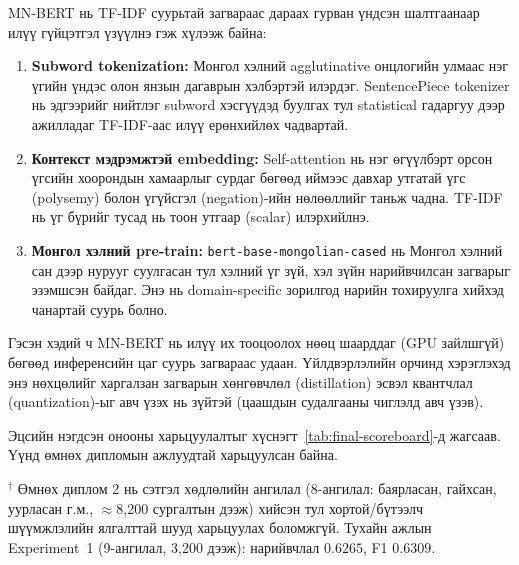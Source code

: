 MN-BERT нь TF-IDF суурьтай загвараас дараах гурван үндсэн шалтгаанаар илүү
гүйцэтгэл үзүүлнэ гэж хүлээж байна:

\begin{enumerate}
  \item \textbf{Subword tokenization:} Монгол хэлний agglutinative онцлогийн
    улмаас нэг үгийн үндэс олон янзын дагаврын хэлбэртэй илэрдэг. SentencePiece
    tokenizer нь эдгээрийг нийтлэг subword хэсгүүдэд буулгах тул statistical
    гадаргуу дээр ажилладаг TF-IDF-аас илүү ерөнхийлөх чадвартай.
  \item \textbf{Контекст мэдрэмжтэй embedding:} Self-attention нь нэг өгүүлбэрт
    орсон үгсийн хоорондын хамаарлыг сурдаг бөгөөд иймээс давхар утгатай
    үгс (polysemy) болон үгүйсгэл (negation)-ийн нөлөөллийг таньж чадна.
    TF-IDF нь үг бүрийг тусад нь тоон утгаар (scalar) илэрхийлнэ.
  \item \textbf{Монгол хэлний pre-train:} \texttt{bert-base-mongolian-cased}
    нь Монгол хэлний сан дээр нурууг суулгасан тул хэлний үг зүй, хэл зүйн
    нарийвчилсан загварыг эзэмшсэн байдаг. Энэ нь domain-specific зорилгод
    нарийн тохируулга хийхэд чанартай суурь болно.
\end{enumerate}

Гэсэн хэдий ч MN-BERT нь илүү их тооцоолох нөөц шаарддаг (GPU зайлшгүй) бөгөөд
инференсийн цаг суурь загвараас удаан. Үйлдвэрлэлийн орчинд хэрэглэхэд энэ
нөхцөлийг харгалзан загварын хөнгөвчлөл (distillation) эсвэл квантчлал (quantization)-ыг авч үзэх нь
зүйтэй (цаашдын судалгааны чиглэлд авч үзэв).

Эцсийн нэгдсэн онооны харьцуулалтыг хүснэгт~\ref{tab:final-scoreboard}-д
жагсаав. Үүнд өмнөх дипломын ажлуудтай харьцуулсан байна.

\begin{table}[H]
\centering
\caption{Эцсийн нэгдсэн үр дүнгийн харьцуулалт}
\label{tab:final-scoreboard}
{\footnotesize $^\dagger$ Өмнөх диплом 2 нь сэтгэл хөдлөлийн ангилал (8-ангилал: баярласан, гайхсан, уурласан г.м., ${\approx}$8{,}200 сургалтын дээж) хийсэн тул хортой/бүтээлч шүүмжлэлийн ялгалттай шууд харьцуулах боломжгүй. Тухайн ажлын Experiment~1 (9-ангилал, 3{,}200 дээж): нарийвчлал $0.6265$, F1 $0.6309$.}
\end{table}

